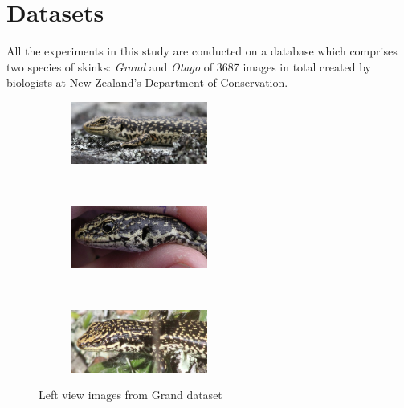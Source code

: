 \graphicspath{{./images/chap3/}}
\chapter{Datasets} %
\label{cha:datasets}

All the experiments in this study are conducted on a database which comprises two
species of skinks: \emph{Grand} and \emph{Otago} of 3687 images in total
created by biologists at New Zealand's Department of Conservation.

\begin{figure}[htb]
  \centering
  \begin{subfigure}[t]{0.31\textwidth}
      \centering
      \includegraphics[width=4.5cm]{dataset/general/grand_L3}
  \end{subfigure}
  ~
  \begin{subfigure}[t]{0.31\textwidth}
      \centering
      \includegraphics[width=4.5cm]{dataset/general/grand_L1}
  \end{subfigure}
  ~
  \begin{subfigure}[t]{0.31\textwidth}
      \centering
      \includegraphics[width=4.5cm]{dataset/general/grand_L2}
  \end{subfigure}
  \captionsetup{justification=centering}
  \caption{Left view images from Grand dataset}
  \label{fig:grand_left} %
\end{figure}

